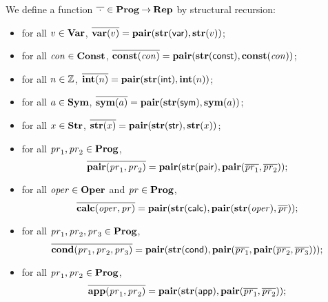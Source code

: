 %
We define a function $\overline{\;\cdot\;}\in\mathbf{Prog}\mathbin{\to}\mathbf{Rep}$
by structural recursion:
\begin{itemize}
\item for all $v\in\mathbf{Var}$,
  $\overline{\mathbf{var}(v)} =
  \mathbf{pair}(\mathbf{str}(\mathsf{var}), \mathbf{str}(v))$;

\item for all $\mathit{con}\in\mathbf{Const}$,
  $\overline{\mathbf{const}(\mathit{con})} =
  \mathbf{pair}(\mathbf{str}(\mathsf{const}), \mathbf{const}(\mathit{con}))$;

\item for all $n\in\mathbb{Z}$, $\overline{\mathbf{int}(n)} =
  \mathbf{pair}(\mathbf{str}(\mathsf{int}), \mathbf{int}(n))$;

\item for all $a\in\mathbf{Sym}$, $\overline{\mathbf{sym}(a)} =
  \mathbf{pair}(\mathbf{str}(\mathsf{sym}), \mathbf{sym}(a))$;

\item for all $x\in\mathbf{Str}$, $\overline{\mathbf{str}(x)} =
  \mathbf{pair}(\mathbf{str}(\mathsf{str}), \mathbf{str}(x))$;

\item for all $\mathit{pr}_1,\mathit{pr}_2\in\mathbf{Prog}$,
  \begin{displaymath}
    \overline{\mathbf{pair}(\mathit{pr}_1,\mathit{pr}_2)} =
    \mathbf{pair}(\mathbf{str}(\mathsf{pair}),
    \mathbf{pair}(\overline{\mathit{pr}_1}, \overline{\mathit{pr}_2})) ;
  \end{displaymath}

\item for all $\mathit{oper}\in\mathbf{Oper}$ and $\mathit{pr}\in\mathbf{Prog}$,
  \begin{displaymath}
    \overline{\mathbf{calc}(\mathit{oper},\mathit{pr})} =
    \mathbf{pair}(\mathbf{str}(\mathsf{calc}),
    \mathbf{pair}(\mathbf{str}(\mathit{oper}), \overline{\mathit{pr}})) ;
  \end{displaymath}

\item for all $\mathit{pr}_1,\mathit{pr}_2,\mathit{pr}_3\in\mathbf{Prog}$,
  \begin{displaymath}
    \overline{\mathbf{cond}(\mathit{pr}_1,\mathit{pr}_2,\mathit{pr}_3)} =
    \mathbf{pair}(\mathbf{str}(\mathsf{cond}),
    \mathbf{pair}(\overline{\mathit{pr}_1},
    \mathbf{pair}(\overline{\mathit{pr}_2}, \overline{\mathit{pr}_3}))) ;
  \end{displaymath}

\item for all $\mathit{pr}_1,\mathit{pr}_2\in\mathbf{Prog}$,
  \begin{displaymath}
    \overline{\mathbf{app}(\mathit{pr}_1,\mathit{pr}_2)} =
    \mathbf{pair}(\mathbf{str}(\mathsf{app}),
    \mathbf{pair}(\overline{\mathit{pr}_1}, \overline{\mathit{pr}_2})) ;
  \end{displaymath}


\end{itemize}
